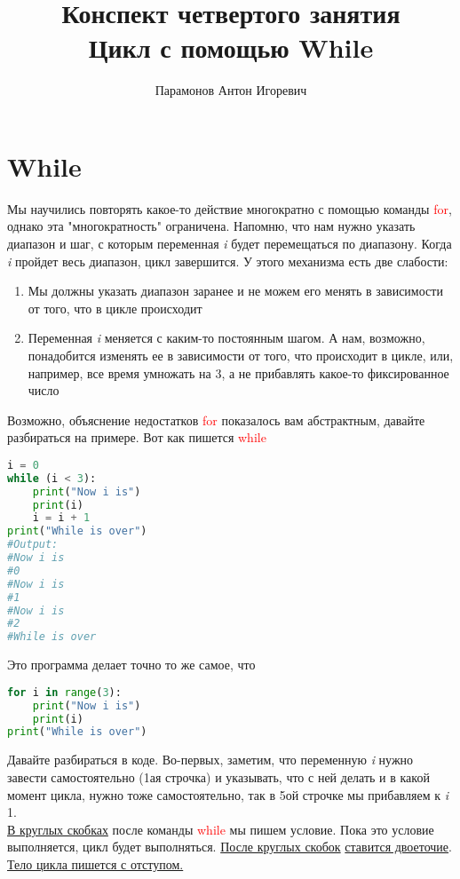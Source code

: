 \documentclass[12pt]{article} %
\newcommand \tab[1][1cm]{\hspace*{#1}}
\begin{document}
\title{Конспект четвертого занятия\\
	\large Цикл с помощью While}
\author{Парамонов Антон Игоревич}
\maketitle
\section{While}
\tab Мы научились повторять какое-то действие многократно с помощью команды \textcolor{red}{for}, однако эта "многократность" ограничена. Напомню, что нам нужно указать диапазон и шаг, с которым переменная \textit{i} будет перемещаться по диапазону. Когда \textit{i} пройдет весь диапазон, цикл завершится. У этого механизма есть две слабости:
\begin{enumerate}
	\item Мы должны указать диапазон заранее и не можем его менять в зависимости от того, что в цикле происходит
	\item Переменная \textit{i} меняется с каким-то постоянным шагом. А нам, возможно, понадобится изменять ее в зависимости от того, что происходит в цикле, или, например, все время умножать на 3, а не прибавлять какое-то фиксированное число
\end{enumerate}
\tab Возможно, объяснение недостатков \textcolor{red}{for} показалось вам абстрактным, давайте разбираться на примере. Вот как пишется \textcolor{red}{while}
\begin{lstlisting}[language=Python]
i = 0
while (i < 3):
	print("Now i is")
	print(i)
	i = i + 1
print("While is over")
#Output:
#Now i is
#0
#Now i is
#1
#Now i is
#2
#While is over
\end{lstlisting}
\tab Это программа делает точно то же самое, что 
\begin{lstlisting}[language=Python]
for i in range(3):
	print("Now i is")
	print(i)
print("While is over")
\end{lstlisting}
\tab Давайте разбираться в коде. Во-первых, заметим, что переменную \textit{i} нужно завести самостоятельно (1ая строчка) и указывать, что с ней делать и в какой момент цикла, нужно тоже самостоятельно, так в 5ой строчке мы прибавляем к \textit{i} 1.\\
\tab \underline{В круглых скобках} после команды \textcolor{red}{while} мы пишем условие. Пока это условие выполняется, цикл будет выполняться. \underline{После круглых скобок} \underline{ставится двоеточие}. \underline{Тело цикла пишется с отступом.}\\
\end{document}

